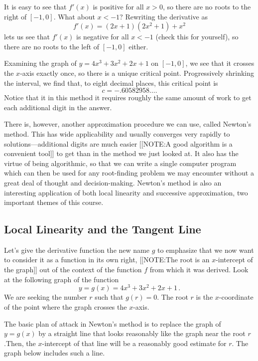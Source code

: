 It is easy to see that $f'(x)$ is positive for all $x>0$, so there are
no roots to the right of $[-1,0]$.  What about $x<-1$?  Rewriting the
derivative as
\[
f'(x) = (2x+1)(2x^2+1) + x^2
\]
lets us see that $f'(x)$ is negative for all $x<-1$ (check this for
yourself), so there are no roots to the left of $[-1,0]$ either.

Examining the graph of $y=4x^3 +3x^2 +2x + 1$ on $[-1,0]$, we see that
it crosses the $x$-axis exactly once, so there is a unique critical
point. Progressively shrinking the interval, we find that, to eight
decimal places, this critical point is
\[
c= -.60582958 \ldots .
\]
Notice that it in this method it requires roughly the same amount of
work to get each additional digit in the answer.

There is, however, another approximation procedure we can use, called
Newton's method.  This has wide applicability and usually converges
very rapidly to solutions---additional digits are much easier
[[NOTE:A good algorithm is  a convenient tool]]
to get than in the method we just looked at.  It also has the virtue
of being algorithmic, so that we can write a single computer program
which can then be used for any root-finding problem we may encounter
without a great deal of thought and decision-making.  Newton's method
is also an interesting application of both local linearity and
successive approximation, two important themes of this course.

\subsection{Local Linearity and the Tangent Line}
\label{subsec:local-linearity-and-the-tangent-line}


Let's give the derivative function the new name $g$ to emphasize that
we now want to consider it as a function in its own right,
[[NOTE:The root is an $x$-intercept of the graph]]     
out of the context of the function $f$ from which it was derived.
Look at the following graph of the function
	\[
y = g(x) = 4x^3 +3x^2 + 2x + 1\,.
\]
We are seeking the number $r$ such that $g(r) = 0$.  The root $r$ is
the $x$-coordinate of the point where the graph crosses the $x$-axis.

The basic plan of attack in Newton's method is to replace the graph of
$y=g(x)$ by a straight line that looks reasonably like the graph near
the root $r$.Then, the $x$-intercept of that line will be a reasonably
good estimate for $r$.  The graph below includes such a line.

